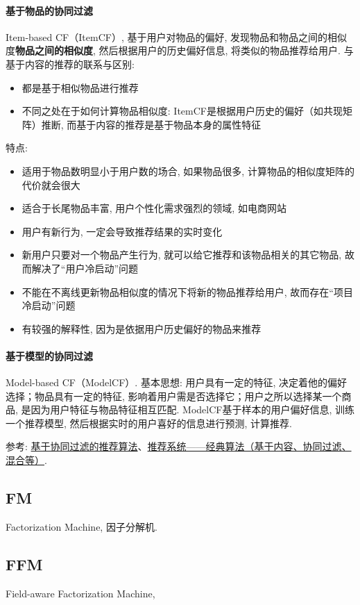 \paragraph{基于物品的协同过滤}
Item-based CF（ItemCF）, 基于用户对物品的偏好, 发现物品和物品之间的相似度\textbf{物品之间的相似度}, 然后根据用户的历史偏好信息, 将类似的物品推荐给用户. 与基于内容的推荐的联系与区别: 
\begin{itemize}
	\item 都是基于相似物品进行推荐
	\item 不同之处在于如何计算物品相似度: ItemCF是根据用户历史的偏好（如共现矩阵）推断, 而基于内容的推荐是基于物品本身的属性特征
\end{itemize}
特点: 
\begin{itemize}
	\item 适用于物品数明显小于用户数的场合, 如果物品很多, 计算物品的相似度矩阵的代价就会很大
	\item 适合于长尾物品丰富, 用户个性化需求强烈的领域, 如电商网站
	\item 用户有新行为, 一定会导致推荐结果的实时变化
	\item 新用户只要对一个物品产生行为, 就可以给它推荐和该物品相关的其它物品, 故而解决了“用户冷启动”问题
	\item 不能在不离线更新物品相似度的情况下将新的物品推荐给用户, 故而存在“项目冷启动”问题
	\item 有较强的解释性, 因为是依据用户历史偏好的物品来推荐
\end{itemize}


\paragraph{基于模型的协同过滤}
Model-based CF（ModelCF）. 基本思想: 用户具有一定的特征, 决定着他的偏好选择；物品具有一定的特征, 影响着用户需是否选择它；用户之所以选择某一个商品, 是因为用户特征与物品特征相互匹配. ModelCF基于样本的用户偏好信息, 训练一个推荐模型, 然后根据实时的用户喜好的信息进行预测, 计算推荐. 

参考: \href{https://www.cnblogs.com/shengyang17/p/11516532.html}{基于协同过滤的推荐算法}、\href{https://zhuanlan.zhihu.com/p/108759393}{推荐系统——经典算法（基于内容、协同过滤、混合等）}. 




\subsection{FM}
Factorization Machine, 因子分解机. 

\subsection{FFM}
Field-aware Factorization Machine, 